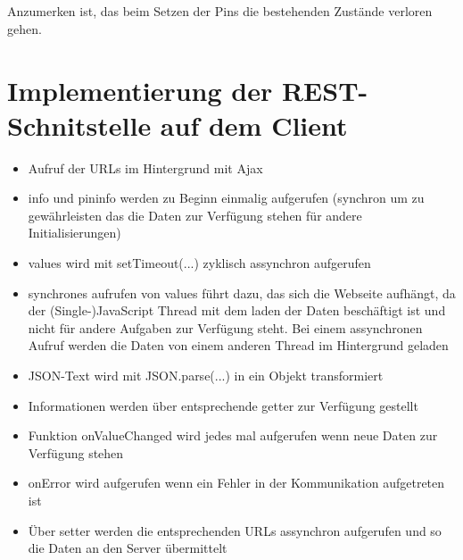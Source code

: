  \\
\\
Anzumerken ist, das beim Setzen der Pins die bestehenden Zustände verloren
gehen. 

\section{Implementierung der REST-Schnitstelle auf dem Client}

\begin{itemize}
	\item Aufruf der URLs im Hintergrund mit Ajax
	\item info und pininfo werden zu Beginn einmalig aufgerufen (synchron um zu 
	      gewährleisten das die Daten zur Verfügung stehen für andere Initialisierungen)
	\item values wird mit setTimeout(...) zyklisch assynchron aufgerufen
	\item synchrones aufrufen von values führt dazu, das sich die Webseite aufhängt, da
	      der (Single-)JavaScript Thread mit dem laden der Daten beschäftigt ist und nicht
	      für andere Aufgaben zur Verfügung steht. Bei einem assynchronen Aufruf werden 
	      die Daten von einem anderen Thread im Hintergrund geladen
	\item JSON-Text wird mit JSON.parse(...) in ein Objekt transformiert
	\item Informationen werden über entsprechende getter zur Verfügung gestellt
	\item Funktion onValueChanged wird jedes mal aufgerufen wenn neue Daten zur 
	      Verfügung stehen
	\item onError wird aufgerufen wenn ein Fehler in der Kommunikation aufgetreten ist
	\item Über setter werden die entsprechenden URLs assynchron aufgerufen und so die 
	      Daten an den Server übermittelt
\end{itemize}